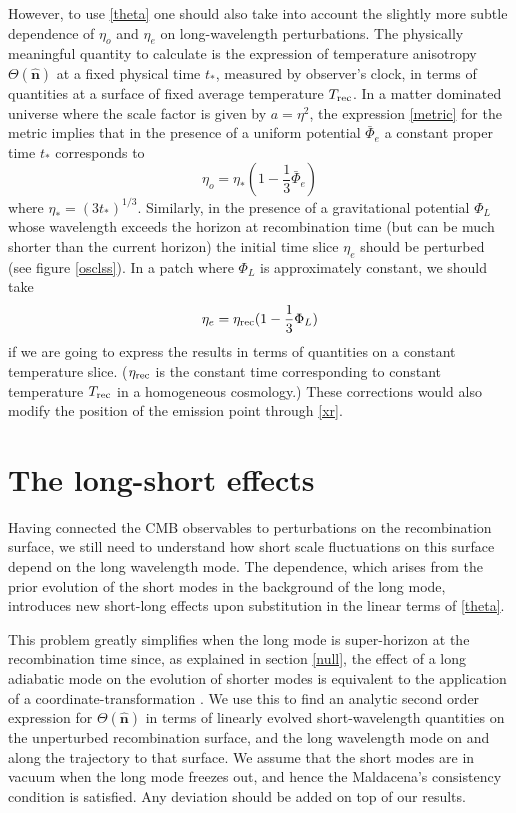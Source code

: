\documentclass[12pt]{article}
\numberwithin{equation}{section}
\def\bsb{\boldsymbol}
\def\be{\begin{equation}}
\def\ee{\end{equation}}
\def\n{\bsb{\hat n}}
\begin{document}
However, to use \eqref{theta} one should also take into account the slightly more subtle dependence of $\eta_o$ and $\eta_e$ on long-wavelength perturbations. The physically meaningful quantity to calculate is the expression of temperature anisotropy $\Theta(\n)$ at a fixed physical time $t_*$, measured by observer's clock, in terms of quantities at a surface of fixed average temperature $T_{\rm rec}$. In a matter dominated universe where the scale factor is given by $a=\eta^2$, the expression \eqref{metric} for the metric implies that in the presence of a uniform potential $\bar\Phi_e$ a constant proper time $t_*$ corresponds to
\be
\label{etao}
\eta_o=\eta_* (1-\frac{1}{3}\bar\Phi_e)
\ee
where $\eta_* = (3 t_*)^{1/3}$. Similarly, in the presence of a gravitational potential $\Phi_L$ whose wavelength exceeds the horizon at recombination time (but can be much shorter than the current horizon) the initial time slice $\eta_e$ should be perturbed (see figure \ref{osclss}). In a patch where $\Phi_L$ is approximately constant, we should take
\be
\label{etarec}
\eta_e = \eta_{\rm rec} (1-\frac{1}{3}\Phi_L)
\ee
if we are going to express the results in terms of quantities on a constant temperature slice. ($\eta_{\rm rec}$ is the constant time corresponding to constant temperature $T_{\rm rec}$ in a homogeneous cosmology.) These corrections would also modify the position of the emission point through \eqref{xr}.


\section{\label{LS}The long-short effects}

Having connected the CMB observables to perturbations on the recombination surface, we still need to understand how short scale fluctuations on this surface depend on the long wavelength mode. The dependence, which arises from the prior evolution of the short modes in the background of the long mode, introduces new short-long effects upon substitution in the linear terms of \eqref{theta}.

This problem greatly simplifies when the long mode is super-horizon at the recombination time since, as explained in section \ref{null}, the effect of a long adiabatic mode on the evolution of shorter modes is equivalent to the application of a coordinate-transformation \cite{Weinberg}. We use this to find an analytic second order expression for $\Theta(\n)$ in terms of linearly evolved short-wavelength quantities on the unperturbed recombination surface, and the long wavelength mode on and along the trajectory to that surface. We assume that the short modes are in vacuum when the long mode freezes out, and hence the Maldacena's consistency condition is satisfied. Any deviation should be added on top of our results.
\end{document}
